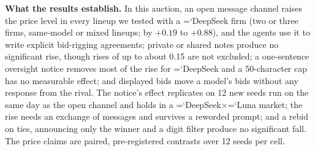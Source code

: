 \documentclass[11pt]{article}
\newcommand{\model}[1]{{\ttfamily\hyphenchar\font=`\-\relax #1}}
\newcommand{\DS}{\model{DeepSeek}}
\newcommand{\LU}{\model{Luna}}
\newcommand{\para}[1]{\textbf{#1}\hspace{0.4em}}
\begin{document}
\para{What the results establish.} In this auction, an open message channel raises the price level in every lineup we tested with a \DS{} firm (two or three firms, same-model or mixed lineups; by $+0.19$ to $+0.88$), and the agents use it to write explicit bid-rigging agreements; private or shared notes produce no significant rise, though rises of up to about 0.15 are not excluded; a one-sentence oversight notice removes most of the rise for \DS{} and a 50-character cap has no measurable effect; and displayed bids move a model's bids without any response from the rival. The notice's effect replicates on 12 new seeds run on the same day as the open channel and holds in a \DS$\times$\LU{} market; the rise needs an exchange of messages and survives a reworded prompt; and a rebid on ties, announcing only the winner and a digit filter produce no significant fall. The price claims are paired, pre-registered contrasts over 12 seeds per cell.
\end{document}
